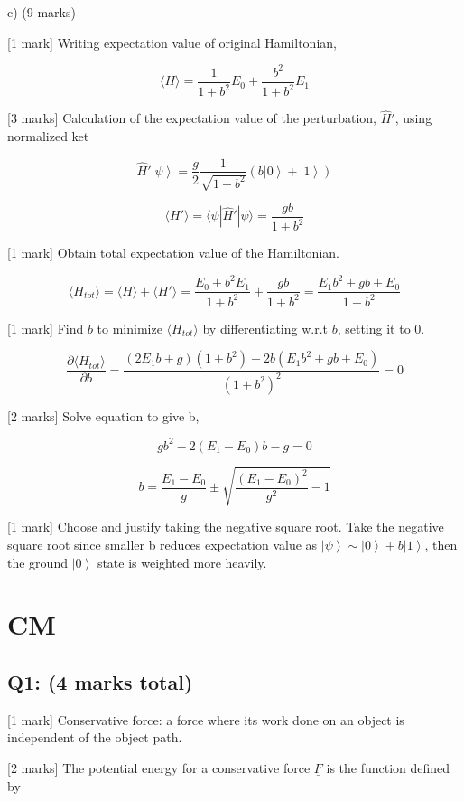 \documentclass[a4paper,11pt]{article}
\begin{document}
c) (9 marks)

[1 mark] Writing expectation value of original Hamiltonian, 

\[ \langle H \rangle = \frac{1}{1+b^2} E_0 + \frac{b^2}{1+b^2} E_1 \]

[3 marks] Calculation of the expectation value of the perturbation, \( \hat{H}' \), using normalized ket

\[ \hat{H}' \left| \psi \right> = \frac{g}{2} \frac{1}{\sqrt{1+b^2}} (b \left| 0 \right> + \left| 1 \right> ) \]

\[ \langle H' \rangle = \langle \psi | \hat{H}' | \psi \rangle = \frac{gb}{1+b^2}\]

[1 mark] Obtain total expectation value of the Hamiltonian. 

\[ \langle H_{tot} \rangle = \langle H \rangle + \langle H' \rangle = \frac{E_0+b^2E_1}{1+b^2} + \frac{gb}{1+b^2} = \frac{E_1 b^2 + gb + E_0}{1+b^2} \]

[1 mark] Find \( b \) to minimize \( \langle H_{tot} \rangle \) by differentiating w.r.t \( b \), setting it to 0. 

\[ \frac{\partial \langle H_{tot} \rangle}{\partial b} = \frac{(2E_1 b + g)(1+b^2) - 2b(E_1 b^2 + gb + E_0)}{(1+b^2)^2} = 0 \]

[2 marks] Solve equation to give b, 

\[ gb^2 - 2(E_1 - E_0)b - g = 0 \]

\[ b = \frac{E_1 - E_0}{g} \pm \sqrt{\frac{(E_1-E_0)^2}{g^2}-1} \]

[1 mark] Choose and justify taking the negative square root. Take the negative square root since smaller b reduces expectation value as \(  \left| \psi \right> \sim \left| 0 \right> + b \left| 1 \right> \), then the ground \( \left| 0 \right> \) state is weighted more heavily. 


\section{CM}

\subsection*{Q1: (4 marks total)}

[1 mark] Conservative force: a force where its work done on an object is independent of the object path.

[2 marks] The potential energy for a conservative force \( \underline{F} \) is the function defined by 
\end{document}
